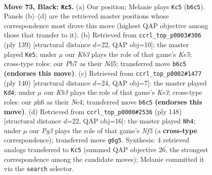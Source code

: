 \documentclass[11pt]{article}
\begin{document}
\clearpage

\begin{figure}[p]\centering
\begin{subfigure}{0.46\textwidth}\centering
\resizebox{\linewidth}{!}{%
\newchessgame
\chessboard[
  setfen={8/1p2R2p/1k4pP/5p2/p4P2/8/1n5K/8 b - - 3 73},
  showmover=false,
  pgfstyle=straightmove, color=movearrow, markmove={b6-c5}
]}
\caption{}
\end{subfigure}\hfill
\begin{subfigure}{0.46\textwidth}\centering
\resizebox{\linewidth}{!}{%
\newchessgame
\chessboard[
  setfen={8/8/8/1R1n1pK1/1p2k3/p5P1/P7/8 b - - 3 70},
  showmover=false,
  pgfstyle=straightmove, color=movearrow, markmove={e4-e5}
]}
\caption{}
\end{subfigure}
\\[4pt]
\begin{subfigure}{0.46\textwidth}\centering
\resizebox{\linewidth}{!}{%
\newchessgame
\chessboard[
  setfen={8/7p/1k4p1/1P6/2P1N3/4K1PP/8/2r5 w - - 7 71},
  showmover=false,
  pgfstyle=straightmove, color=movearrow, markmove={e3-d4}
]}
\caption{}
\end{subfigure}\hfill
\begin{subfigure}{0.46\textwidth}\centering
\resizebox{\linewidth}{!}{%
\newchessgame
\chessboard[
  setfen={8/3k4/8/p3pN2/P3P3/1PKP4/4r3/8 w - - 2 75},
  showmover=false,
  pgfstyle=straightmove, color=movearrow, markmove={f5-h4}
]}
\caption{}
\end{subfigure}
\caption{\textbf{Move 73, Black: \texttt{Kc5}.} (a) Our position; Melanie plays \texttt{Kc5} (\texttt{b6c5}). Panels (b)--(d) are the retrieved master positions whose correspondence most drove this move (highest QAP objective among those that transfer to it). (b) Retrieved from \texttt{ccrl\_top\_p0003\#306} (ply 139) [structural distance $d$=22, QAP obj=10]: the master played \texttt{Ke5}; under $\mu$ our \emph{Kb3} plays the role of that game's \emph{Ke5}; cross-type roles: our \emph{P}b7 as their \emph{N}d5; transferred move \texttt{b6c5} \textbf{(endorses this move)}. (c) Retrieved from \texttt{ccrl\_top\_p0002\#1477} (ply 140) [structural distance $d$=24, QAP obj=7]: the master played \texttt{Kd4}; under $\mu$ our \emph{Kb3} plays the role of that game's \emph{Ke3}; cross-type roles: our \emph{p}h6 as their \emph{N}e4; transferred move \texttt{b6c5} \textbf{(endorses this move)}. (d) Retrieved from \texttt{ccrl\_top\_p0000\#2536} (ply 148) [structural distance $d$=22, QAP obj=16]: the master played \texttt{Nh4}; under $\mu$ our \emph{Pg3} plays the role of that game's \emph{Nf5} (a \textbf{cross-type} correspondence); transferred move \texttt{g6g5}. Synthesis: 4 retrieved analogs transferred to \texttt{Kc5} (summed QAP objective 26, the strongest correspondence among the candidate moves); Melanie committed it via the \texttt{search} selector.}
\label{fig:thought-m145}
\end{figure}
\end{document}
